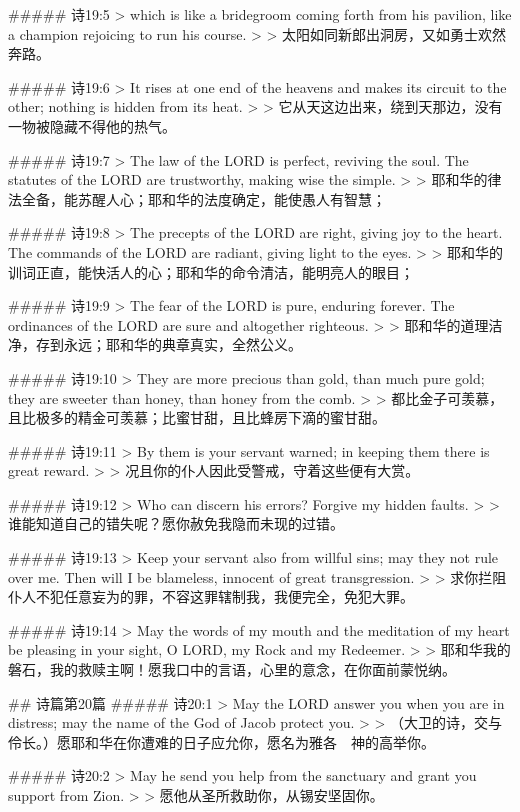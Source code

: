 ##### 诗19:5
> which is like a bridegroom coming forth from his pavilion, like a champion rejoicing to run his course.
>
> 太阳如同新郎出洞房，又如勇士欢然奔路。


##### 诗19:6
> It rises at one end of the heavens and makes its circuit to the other; nothing is hidden from its heat.
>
> 它从天这边出来，绕到天那边，没有一物被隐藏不得他的热气。


##### 诗19:7
> The law of the LORD is perfect, reviving the soul. The statutes of the LORD are trustworthy, making wise the simple.
>
> 耶和华的律法全备，能苏醒人心；耶和华的法度确定，能使愚人有智慧；


##### 诗19:8
> The precepts of the LORD are right, giving joy to the heart. The commands of the LORD are radiant, giving light to the eyes.
>
> 耶和华的训词正直，能快活人的心；耶和华的命令清洁，能明亮人的眼目；


##### 诗19:9
> The fear of the LORD is pure, enduring forever. The ordinances of the LORD are sure and altogether righteous.
>
> 耶和华的道理洁净，存到永远；耶和华的典章真实，全然公义。


##### 诗19:10
> They are more precious than gold, than much pure gold; they are sweeter than honey, than honey from the comb.
>
> 都比金子可羡慕，且比极多的精金可羡慕；比蜜甘甜，且比蜂房下滴的蜜甘甜。


##### 诗19:11
> By them is your servant warned; in keeping them there is great reward.
>
> 况且你的仆人因此受警戒，守着这些便有大赏。


##### 诗19:12
> Who can discern his errors? Forgive my hidden faults.
>
> 谁能知道自己的错失呢？愿你赦免我隐而未现的过错。


##### 诗19:13
> Keep your servant also from willful sins; may they not rule over me. Then will I be blameless, innocent of great transgression.
>
> 求你拦阻仆人不犯任意妄为的罪，不容这罪辖制我，我便完全，免犯大罪。


##### 诗19:14
> May the words of my mouth and the meditation of my heart be pleasing in your sight, O LORD, my Rock and my Redeemer.
>
> 耶和华我的磐石，我的救赎主啊！愿我口中的言语，心里的意念，在你面前蒙悦纳。


## 诗篇第20篇
##### 诗20:1
> May the LORD answer you when you are in distress; may the name of the God of Jacob protect you.
>
> （大卫的诗，交与伶长。）愿耶和华在你遭难的日子应允你，愿名为雅各　神的高举你。


##### 诗20:2
> May he send you help from the sanctuary and grant you support from Zion.
>
> 愿他从圣所救助你，从锡安坚固你。


